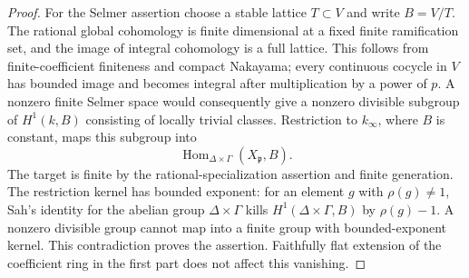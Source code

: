 \begin{proof}
For the Selmer assertion choose a stable lattice \(T\subset V\)
and write \(B=V/T\). The rational global cohomology is finite
dimensional at a fixed finite ramification set, and the image
of integral cohomology is a full lattice. This follows from
finite-coefficient finiteness and compact Nakayama; every
continuous cocycle in \(V\) has bounded image and becomes
integral after multiplication by a power of \(p\).
A nonzero finite Selmer space would consequently give a
nonzero divisible subgroup of \(H^1(k,B)\) consisting of
locally trivial classes. Restriction to \(k_\infty\), where
\(B\) is constant, maps this subgroup into
\[
 \operatorname{Hom}_{\Delta\times\Gamma}
       (X_{\mathfrak p},B).
\]
The target is finite by the rational-specialization assertion
and finite generation. The restriction kernel has bounded
exponent: for an element \(g\) with \(\rho(g)\ne1\), Sah's
identity for the abelian group \(\Delta\times\Gamma\) kills
\(H^1(\Delta\times\Gamma,B)\) by \(\rho(g)-1\).
A nonzero divisible group cannot map into a finite group with
bounded-exponent kernel. This contradiction proves the
assertion. Faithfully flat extension of the coefficient ring
in the first part does not affect this vanishing.
\end{proof}

